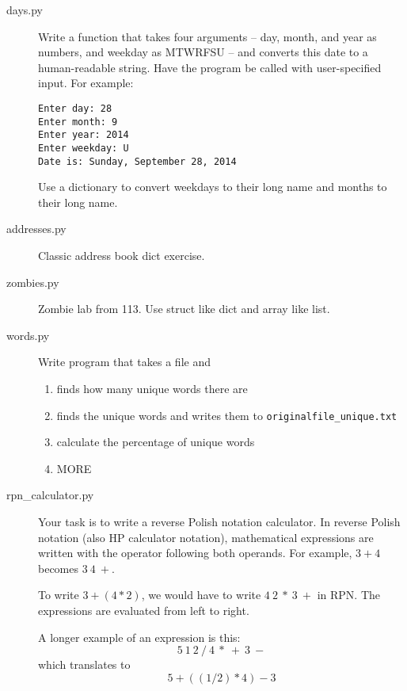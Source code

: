 \documentclass[11pt]{cselabheader}
\begin{document}
\begin{description}
  \item[days.py] Write a function that takes four arguments -- day, month, and
    year as numbers, and weekday as MTWRFSU -- and converts this date to a
    human-readable string. Have the program be called with user-specified
    input. For example:
    \begin{lstlisting}[style=bash]
Enter day: 28
Enter month: 9
Enter year: 2014
Enter weekday: U
Date is: Sunday, September 28, 2014
    \end{lstlisting}

    Use a dictionary to convert weekdays to their long name and months to their
    long name.

  \item[addresses.py] Classic address book dict exercise.

  \item[zombies.py] Zombie lab from 113. Use struct like dict and array like
    list.

  \item[words.py] Write program that takes a file and
    \begin{enumerate}
      \item finds how many unique words there are
      \item finds the unique words and writes them to
        \texttt{originalfile\_unique.txt}
      \item calculate the percentage of unique words
      \item MORE
    \end{enumerate}


  \item[rpn\_calculator.py] Your task is to write a reverse Polish notation
    calculator. In reverse Polish notation (also HP
    calculator notation), mathematical expressions are written with the operator
    following both operands. For example, $3 + 4$ becomes $3~4~+$.

    To write $3 + (4 * 2)$, we would have to write $4~2~*~3~+$ in RPN. The
    expressions are evaluated from left to right.

    A longer example of an expression is this: 
    \[ 5~1~2~/~4~*~+~3~- \]
    which translates to
    \[ 5 + ( (1 / 2) * 4 ) - 3 \]


\end{description}
\end{document}
